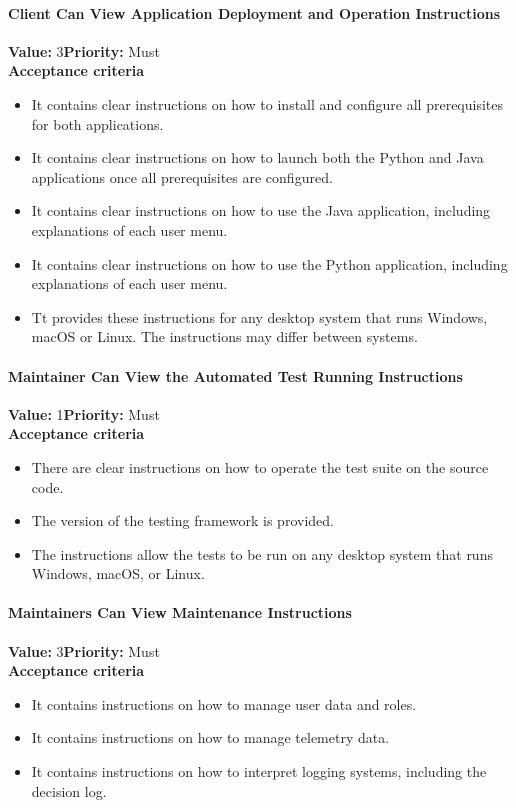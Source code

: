 \paragraph{Client Can View Application Deployment and Operation Instructions}
\textbf{Value:} 3\quad \textbf{Priority:} Must\\
\textbf{Acceptance criteria}
\begin{itemize}
  \item It contains clear instructions on how to install and configure all prerequisites for both applications.
  \item It contains clear instructions on how to launch both the Python and Java applications once all prerequisites are configured.
  \item It contains clear instructions on how to use the Java application, including explanations of each user menu.
  \item It contains clear instructions on how to use the Python application, including explanations of each user menu.
  \item Tt provides these instructions for any desktop system that runs Windows, macOS or Linux. The instructions may differ between systems.
\end{itemize}

\paragraph{Maintainer Can View the Automated Test Running Instructions}
\textbf{Value:} 1\quad \textbf{Priority:} Must\\
\textbf{Acceptance criteria}
\begin{itemize}
  \item There are clear instructions on how to operate the test suite on the source code.
  \item The version of the testing framework is provided.
  \item The instructions allow the tests to be run on any desktop system that runs Windows, macOS, or Linux.
\end{itemize}

\paragraph{Maintainers Can View Maintenance Instructions}
\textbf{Value:} 3\quad \textbf{Priority:} Must\\
\textbf{Acceptance criteria}
\begin{itemize}
  \item It contains instructions on how to manage user data and roles.
  \item It contains instructions on how to manage telemetry data.
  \item It contains instructions on how to interpret logging systems, including the decision log.
\end{itemize}

